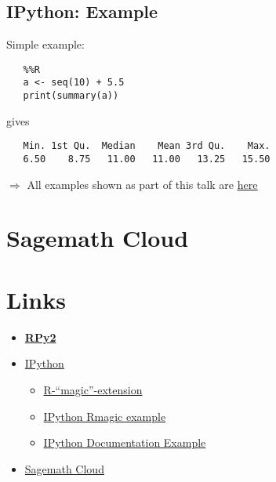 \documentclass[
paper=128mm:96mm, %
fontsize=11pt, %
pagesize, %
parskip=half-, %
]{scrartcl} %
\newcommand*{\mygreen}[1]{\textcolor{mygreen}{#1}}
\theoremstyle{mythmstyle} %
\def\shorttitle{R meets Python}
\newcommand*{\runninghead}{\shorttitle} %
\newcommand*{\newhead}[1]{\renewcommand*{\runninghead}{\shorttitle: #1}}
\begin{document}
\subsection{IPython: Example}

Simple example:
\begin{verbatim}
   %%R
   a <- seq(10) + 5.5
   print(summary(a))
\end{verbatim}
gives
\begin{verbatim}
   Min. 1st Qu.  Median    Mean 3rd Qu.    Max.
   6.50    8.75   11.00   11.00   13.25   15.50
\end{verbatim}

\mygreen{$\Rightarrow{}$ All examples shown as part of this talk are
\href{http://nbviewer.ipython.org/urls/github.com/sagemath/cloud-examples/raw/master/r/rmagic.ipynb}{\uline{here}}}

\clearpage
\newhead{Sagemath Cloud}
\section{Sagemath Cloud}


\clearpage
\newhead{Links}
\section{Links}

\begin{itemize}
\item \href{http://rpy.sourceforge.net/rpy2.html}{\textbf{RPy2}}
\item \href{http://www.ipython.org}{IPython}
\begin{itemize}
\item \href{http://ipython.org/ipython-doc/dev/config/extensions/rmagic.html}{R-``magic''-extension}
\item \href{http://nbviewer.ipython.org/urls/github.com/sagemath/cloud-examples/raw/master/r/rmagic.ipynb}{IPython Rmagic example}
\item \href{http://nbviewer.ipython.org/urls/github.com/ipython/ipython/raw/master/examples/notebooks/R Magics.ipynb}{IPython Documentation Example}
\end{itemize}
\item \href{https://cloud.sagemath.org}{Sagemath Cloud}
\end{itemize}


\end{document}
